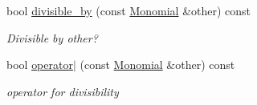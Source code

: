 \begin{Indent}
\begin{DoxyCompactItemize}
\mbox{\label{group__polygroup_aa0341b299fa1fcd4459f9a6810768f0e}} 
bool \hyperlink{group__polygroup_aa0341b299fa1fcd4459f9a6810768f0e}{divisible\+\_\+by} (const \hyperlink{group__polygroup_class_monomial}{Monomial} \&other) const
\begin{DoxyCompactList}\small\item\em Divisible by {\ttfamily other}? \end{DoxyCompactList}\item 
\mbox{\label{group__polygroup_a4673d0cabc6284ce01a08f6c9f71a646}} 
bool \hyperlink{group__polygroup_a4673d0cabc6284ce01a08f6c9f71a646}{operator$\vert$} (const \hyperlink{group__polygroup_class_monomial}{Monomial} \&other) const
\begin{DoxyCompactList}\small\item\em operator for divisibility \end{DoxyCompactList}\end{DoxyCompactItemize}
\end{Indent}
